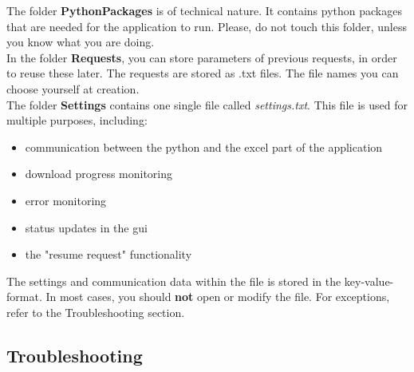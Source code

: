 The folder \textbf{PythonPackages} is of technical nature. It contains python packages that are needed for the application to run. Please, do not touch this folder, unless you know what you are doing. \\

In the folder \textbf{Requests}, you can store parameters of previous requests, in order to reuse these later. The requests are stored as .txt files. The file names you can choose yourself at creation. \\

The folder \textbf{Settings} contains one single file called \textit{settings.txt}. This file is used for multiple purposes, including: 

\begin{itemize}
	\item communication between the python and the excel part of the application
	\item download progress monitoring
	\item error monitoring
	\item status updates in the gui
	\item the "resume request" functionality
\end{itemize}
The settings and communication data within the file is stored in the key-value-format. In most cases, you should \textbf{not} open or modify the file. For exceptions, refer to the Troubleshooting section. 

\subsection{Troubleshooting}

